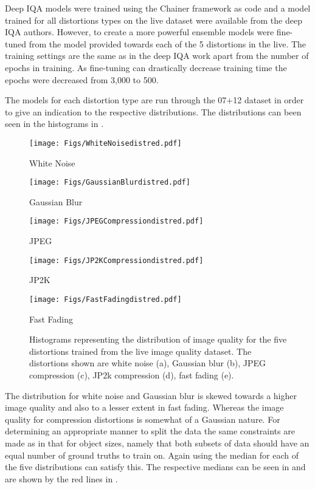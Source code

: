 \documentclass[a4paper,twoside]{article}
\begin{document}
Deep IQA models were trained using the Chainer framework \cite{chainer} as code and a model trained for all distortions types on the \gls{live} dataset were available from the deep IQA authors. However, to create a more powerful ensemble models were fine-tuned from the model provided towards each of the 5 distortions in the \gls{live}. The training settings are the same as in the deep IQA work apart from the number of epochs in training. As fine-tuning can drastically decrease training time the epochs were decreased from 3,000 to 500.

The models for each distortion type are run through the 07+12 dataset in order to give an indication to the respective distributions. The distributions can been seen in the histograms in .

\begin{figure*}[!h]
  \texttt{[image: Figs/WhiteNoisedistred.pdf]}
  \caption*{White Noise}\label{fig:dist_wn}
\endminipage\hfill
{}
  \texttt{[image: Figs/GaussianBlurdistred.pdf]}
  \caption*{Gaussian Blur}\label{fig:dist_gb}
\endminipage\hfill
{}
  \texttt{[image: Figs/JPEGCompressiondistred.pdf]}
  \caption*{JPEG}\label{fig:dist_jp}
\endminipage\hfill
{}
  \texttt{[image: Figs/JP2KCompressiondistred.pdf]}
  \caption*{JP2K}\label{fig:dist_jk}
\endminipage\hfill
{}%
  \texttt{[image: Figs/FastFadingdistred.pdf]}
  \caption*{Fast Fading}\label{fig:dist_ff}
\endminipage
\caption{Histograms representing the distribution of image quality for the five distortions trained from the \gls{live} image quality dataset. The distortions shown are white noise (a), Gaussian blur (b), JPEG compression (c), JP2k compression (d), fast fading (e).}
\label{fig:iqdist}
\end{figure*}

The distribution for white noise and Gaussian blur is skewed towards a higher image quality and also to a lesser extent in fast fading. Whereas the image quality for compression distortions is somewhat of a Gaussian nature. For determining an appropriate manner to split the data the same constraints are made as in that for object sizes, namely that both subsets of data should have an equal number of ground truths to train on. Again using the median for each of the five distributions can satisfy this. The respective medians can be seen in  and are shown by the red lines in .
\end{document}
